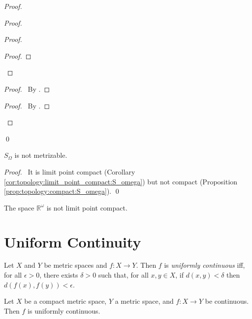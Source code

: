 \begin{proof}
\begin{proof}
\begin{proof}
\begin{proof}
      \end{proof}
    \end{proof}
    \begin{proof}
      \pf\ By .
    \end{proof}
    \begin{proof}
      \pf\ By .
    \end{proof}
  \end{proof}
  \qed
\end{proof}

\begin{cor}
 $S_\Omega$ is not metrizable.
\end{cor}

\begin{proof}
 \pf\ It is limit point compact (Corollary
\ref{cor:topology:limit_point_compact:S_omega}) but not compact (Proposition
\ref{prop:topology:compact:S_omega}). \qed
\end{proof}

\begin{cor}
  The space $\mathbb{R}^\omega$ is not limit point compact.
\end{cor}

\section{Uniform Continuity}

\begin{df}
  Let $X$ and $Y$ be metric spaces and $f : X \rightarrow Y$. Then $f$ is
  \emph{uniformly continuous} iff, for all $\epsilon > 0$, there exists
  $\delta > 0$ such that, for all $x, y \in X$, if $d(x, y) < \delta$ then
  $d(f(x), f(y)) < \epsilon$.
\end{df}

\begin{thm}
  Let $X$ be a compact metric space, $Y$ a metric space, and $f : X
  \rightarrow Y$ be continuous. Then $f$ is uniformly continuous.
\end{thm}


